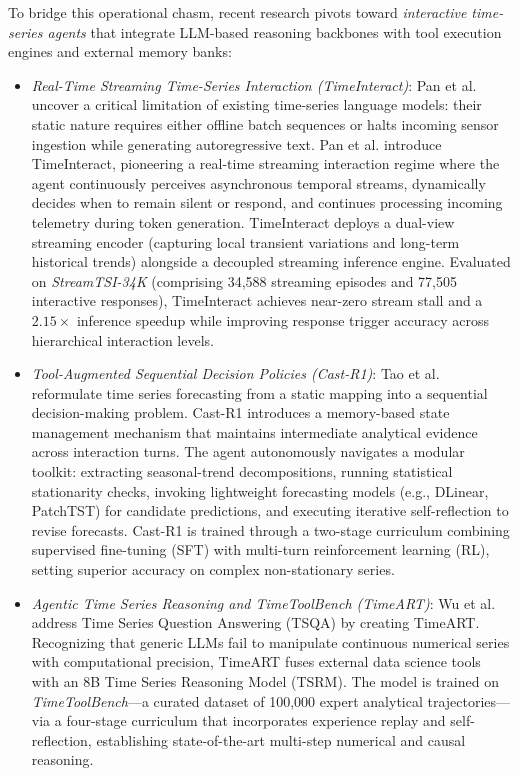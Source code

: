 To bridge this operational chasm, recent research pivots toward \emph{interactive time-series agents} that integrate LLM-based reasoning backbones with tool execution engines and external memory banks:
\begin{itemize}[leftmargin=*]
    \item \emph{Real-Time Streaming Time-Series Interaction (TimeInteract)}: Pan et al.~\cite{pan2026timeinteract} uncover a critical limitation of existing time-series language models: their static nature requires either offline batch sequences or halts incoming sensor ingestion while generating autoregressive text. Pan et al. introduce TimeInteract, pioneering a real-time streaming interaction regime where the agent continuously perceives asynchronous temporal streams, dynamically decides when to remain silent or respond, and continues processing incoming telemetry during token generation. TimeInteract deploys a dual-view streaming encoder (capturing local transient variations and long-term historical trends) alongside a decoupled streaming inference engine. Evaluated on \emph{StreamTSI-34K} (comprising 34,588 streaming episodes and 77,505 interactive responses), TimeInteract achieves near-zero stream stall and a $2.15\times$ inference speedup while improving response trigger accuracy across hierarchical interaction levels.
    \item \emph{Tool-Augmented Sequential Decision Policies (Cast-R1)}: Tao et al.~\cite{tao2026castr1} reformulate time series forecasting from a static mapping into a sequential decision-making problem. Cast-R1 introduces a memory-based state management mechanism that maintains intermediate analytical evidence across interaction turns. The agent autonomously navigates a modular toolkit: extracting seasonal-trend decompositions, running statistical stationarity checks, invoking lightweight forecasting models (e.g., DLinear, PatchTST) for candidate predictions, and executing iterative self-reflection to revise forecasts. Cast-R1 is trained through a two-stage curriculum combining supervised fine-tuning (SFT) with multi-turn reinforcement learning (RL), setting superior accuracy on complex non-stationary series.
    \item \emph{Agentic Time Series Reasoning and TimeToolBench (TimeART)}: Wu et al.~\cite{wu2026timeart} address Time Series Question Answering (TSQA) by creating TimeART. Recognizing that generic LLMs fail to manipulate continuous numerical series with computational precision, TimeART fuses external data science tools with an 8B Time Series Reasoning Model (TSRM). The model is trained on \emph{TimeToolBench}—a curated dataset of 100,000 expert analytical trajectories—via a four-stage curriculum that incorporates experience replay and self-reflection, establishing state-of-the-art multi-step numerical and causal reasoning.

\end{itemize}
